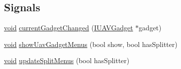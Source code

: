 \subsection*{\-Signals}
\begin{DoxyCompactItemize}
\item 
\hyperlink{group___u_a_v_objects_plugin_ga444cf2ff3f0ecbe028adce838d373f5c}{void} \hyperlink{group___core_plugin_ga449b6a03dd8f841eb0c2affb355c3222}{current\-Gadget\-Changed} (\hyperlink{class_core_1_1_i_u_a_v_gadget}{\-I\-U\-A\-V\-Gadget} $\ast$gadget)
\item 
\hyperlink{group___u_a_v_objects_plugin_ga444cf2ff3f0ecbe028adce838d373f5c}{void} \hyperlink{group___core_plugin_gada32375a929c149e998d237f69fb80c3}{show\-Uav\-Gadget\-Menus} (bool show, bool has\-Splitter)
\item 
\hyperlink{group___u_a_v_objects_plugin_ga444cf2ff3f0ecbe028adce838d373f5c}{void} \hyperlink{group___core_plugin_ga8ebf1483f2a75640eba7aff245feb214}{update\-Split\-Menus} (bool has\-Splitter)
\end{DoxyCompactItemize}
